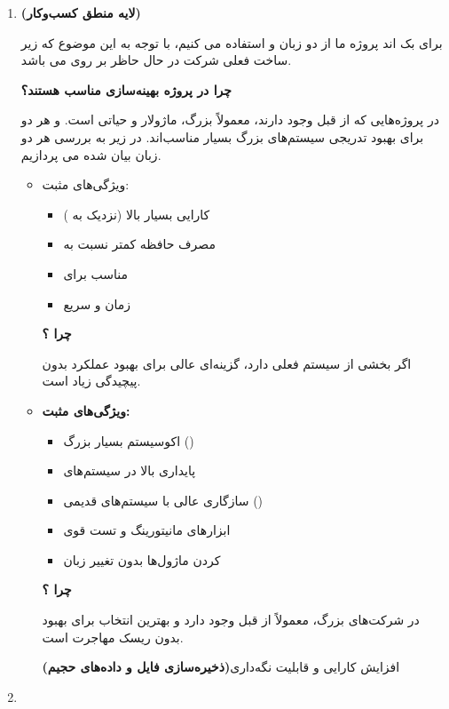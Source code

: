 \documentclass[12pt,a4paper]{report}
\begin{document}
\begin{enumerate}
	\item 
\textbf{ (لایه منطق کسب‌وکار)}

برای بک اند پروژه ما از دو زبان  و  استفاده می کنیم، با توجه به این موضوع که زیر ساخت فعلی شرکت در حال حاظر بر روی   می باشد.

\textbf{چرا در پروژه بهینه‌سازی مناسب هستند؟}

در پروژه‌هایی که از قبل وجود دارند،  معمولاً بزرگ، ماژولار و حیاتی است.  و هر دو برای بهبود تدریجی سیستم‌های بزرگ بسیار مناسب‌اند. در زیر به بررسی هر دو زبان بیان شده می پردازیم.
\begin{itemize}
	\item 

\textbf{}

ویژگی‌های مثبت:
\begin{itemize}
	\item 
کارایی بسیار بالا (نزدیک به )
	\item 
مصرف حافظه کمتر نسبت به 
	\item
مناسب برای 
	\item
زمان  و  سریع
\end{itemize}

\textbf{چرا ؟}

اگر بخشی از سیستم فعلی  دارد،  گزینه‌ای عالی برای بهبود عملکرد بدون پیچیدگی زیاد است.
\item
\textbf{}

\textbf{ویژگی‌های مثبت:}
\begin{itemize}
	\item 
اکوسیستم بسیار بزرگ ()
	\item 
پایداری بالا در سیستم‌های 
	\item
سازگاری عالی با سیستم‌های قدیمی ()
	\item 
ابزارهای مانیتورینگ و تست قوی
	\item 
	 کردن ماژول‌ها بدون تغییر زبان
\end{itemize}
\textbf{چرا ؟}

در شرکت‌های بزرگ،  معمولاً از قبل وجود دارد و بهترین انتخاب برای بهبود بدون ریسک مهاجرت است.

افزایش کارایی و قابلیت نگه‌داری\textbf{(ذخیره‌سازی فایل و داده‌های حجیم)}
\end{itemize}
\item 
{}


\end{enumerate}
\end{document}

